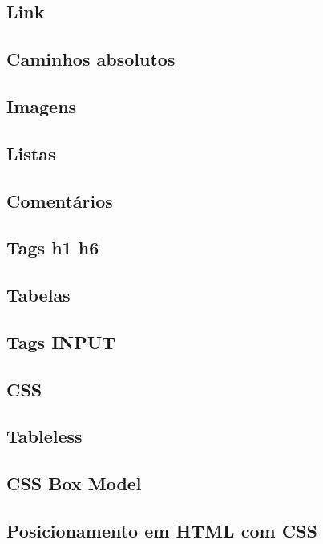 \subsection{Link}

\subsection{Caminhos absolutos}

\subsection{Imagens}

\subsection{Listas}

\subsection{Comentários}

\subsection{Tags h1 h6}

\subsection{Tabelas}

\subsection{Tags INPUT}

\subsection{CSS}

\subsection{Tableless}

\subsection{CSS Box Model}

\subsection{Posicionamento em HTML com CSS}

